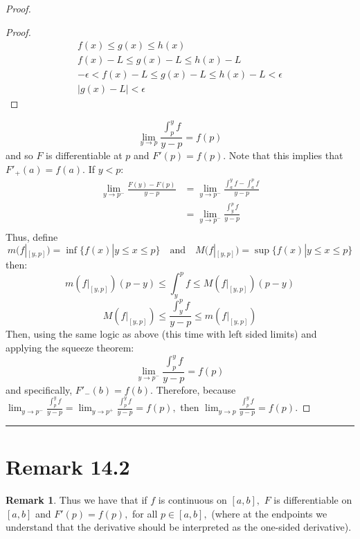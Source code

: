 \documentclass[openany, amssymb, psamsfonts]{amsart}
\theoremstyle{definition}
\newtheorem{rem}{Remark}[section]
\numberwithin{equation}{section}
\begin{document}
\begin{proof}
{\begin{proof}
    \begin{align*}
        f(x) \leq g(x) \leq h(x)\\
        f(x) - L \leq g(x) - L \leq h(x) - L\\
        -\epsilon < f(x) - L \leq g(x) - L \leq h(x) - L < \epsilon\\
        |g(x) - L| < \epsilon
    \end{align*}
\end{proof}}
\[\lim_{y\to p}\frac{\int_p^yf}{y-p} = f(p)\] and so $F$ is differentiable at $p$ and $F'(p) = f(p).$ Note that this implies that $F'_+(a) = f(a).$ 
\newline\newline If $y<p:$ \begin{align*}
    \lim_{y\to p^-}\frac{F(y) - F(p)}{y-p} &= \lim_{y\to p^-}\frac{\int_a^yf - \int_a^p f}{y-p}\\
&= \lim_{y\to p^-}\frac{\int_y^pf}{y-p}\\
\end{align*}
Thus, define 
\[m(f|_{[y,p]}) = \inf\{f(x)| y\leq x \leq p\} \quad \text{and} \quad M(f|_{[y,p]}) = \sup\{f(x)| y\leq x \leq p\}\] then:
\[m(f|_{[y,p]})(p-y)\leq \int_y^pf \leq M(f|_{[y,p]})(p-y)\]
\[M(f|_{[y,p]}) \leq \frac{\int_y^pf}{y-p} \leq m(f|_{[y,p]})\]
Then, using the same logic as above (this time with left sided limits) and applying the squeeze theorem:
\[\lim_{y\to p^-}\frac{\int_p^yf}{y-p} = f(p)\]
and specifically, $F'_-(b) = f(b).$
\newline\newline
Therefore, because $\displaystyle\lim_{y\to p^-}\frac{\int_p^yf}{y-p} = \displaystyle\lim_{y\to p^+}\frac{\int_p^yf}{y-p} = f(p),$ then $\displaystyle\lim_{y\to p}\frac{\int_p^yf}{y-p} = f(p).$
\end{proof}\vspace{4pt}     \hrule   \vspace{4pt} 

\section*{Remark 14.2}
\begin{rem}
\label{14.2}
Thus we have that if $f$ is continuous on $[a,b],$ 
$F$ is differentiable on $[a,b]$ and $F'(p)=f(p),$ for all $p\in [a,b],$ (where at the endpoints we understand that the derivative should be interpreted as the one-sided derivative).
\end{rem}
\end{document}
